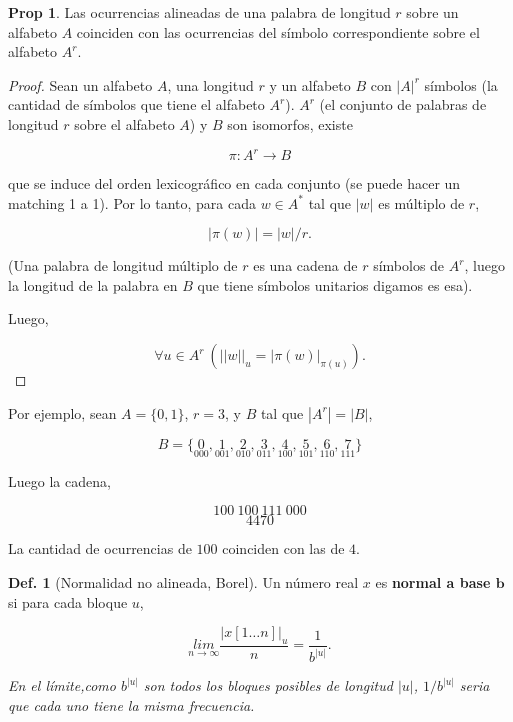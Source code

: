 \documentclass{report}
\theoremstyle{definition} %
\newtheorem*{proposition*}{Prop}
\newtheorem{definition}{Def.}
\begin{document}
\begin{proposition*}
    Las ocurrencias alineadas de una palabra de longitud $r$ sobre un alfabeto
    $A$ coinciden con las ocurrencias del símbolo correspondiente sobre el
    alfabeto $A^r$.
\end{proposition*}
\begin{proof}
    Sean un alfabeto $A$, una longitud $r$ y un alfabeto $B$ con $|A|^r$
    símbolos (la cantidad de símbolos que tiene el alfabeto $A^r$). $A^r$ (el
    conjunto de palabras de longitud $r$ sobre el alfabeto $A$) y $B$ son
    isomorfos, existe

    $$\pi: A^r \to B$$

    que se induce del orden lexicográfico en cada conjunto (se puede hacer un
    matching 1 a 1). Por lo tanto, para cada $w \in A^*$ tal que $|w|$ es
    múltiplo de $r$,

    $$|\pi(w)| = |w| / r.$$

    (Una palabra de longitud múltiplo de $r$ es una cadena de $r$ símbolos de
    $A^r$, luego la longitud de la palabra en $B$ que tiene símbolos unitarios
    digamos es esa).

    Luego,

    $$\forall u \in A^r \ (||w||_u = |\pi(w)|_{\pi(u)}).$$
\end{proof}

Por ejemplo, sean $A = \{0, 1\}$, $r = 3$, y $B$ tal que $|A^r| = |B|$,

$$B = \{
    \underset{000}{0},
    \underset{001}{1},
    \underset{010}{2},
    \underset{011}{3},
    \underset{100}{4},
    \underset{101}{5},
    \underset{110}{6},
    \underset{111}{7}
\}$$

Luego la cadena,

$$100\ 100\ 111\ 000$$
$$4470$$

La cantidad de ocurrencias de $100$ coinciden con las de $4$.

\begin{definition}[Normalidad no alineada, Borel]
    Un número real $x$ es \textbf{normal a base $\bm{b}$} si para cada bloque
    $u$,

    $$
    \underset{n \to \infty}{lim}
        \frac{|x[1\dots n]|_u}{n} =
        \frac{1}{b^{|u|}}.
    $$

    \textit{En el límite,como $b^{|u|}$ son todos los bloques posibles de
    longitud $|u|$, $1/b^{|u|}$ seria que cada uno tiene la misma frecuencia.}
\end{definition}
\end{document}
